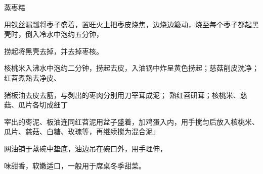 \begin{recipe}{蒸枣糕}

\ingredients


\cooking

\step 用铁丝漏瓢将枣子盛着，置旺火上把枣皮烧焦，边烧边簸动，烧至每个枣子都起黑壳时，倒入冷水中泡约五分钟，

捞起将黑壳去掉，并去掉枣核。

\step 核桃米入沸水中泡约二分钟，捞起去皮，入油锅中炸呈黄色捞起；慈菇削皮洗净；红苕煮熟去净皮、

猪板油去皮去筋，与剥出的枣肉分别用刀宰茸成泥； 熟红苕研茸；核桃米、慈菇、瓜片各切成细丁

\step 宰出的枣泥、板油连同红苕泥用盆子盛着，加鸡蛋入内，用手搅匀后放入核桃米、瓜片、慈菇、白糖、玫瑰等，再继续搅为混合泥」

\step 网油铺于蒸碗中垫底，油边吊在碗口外，用手理伸，

\notes

味甜香，软嫩适口，一般用于席桌冬季甜菜。

\end{recipe}

